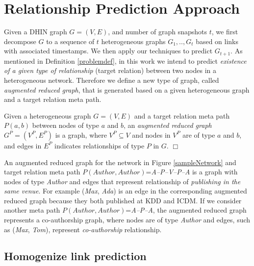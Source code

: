 \section{Relationship Prediction Approach}

Given a DHIN graph $G=(V,E)$, and number of graph snapshots $t$, we first decompose $G$ to a sequence of $t$ heterogeneous graphs ${G_1, .., G_t}$ based on links with associated timestamps. We then apply our techniques to predict $G_{t+1}$. As mentioned in Definition \ref{problemdef}, in this work we intend to predict \textit{existence of a given type of relationship} (target relation) between two nodes in a heterogeneous network. Therefore we define a new type of graph, called \textit{augmented reduced graph}, that is generated based on a given heterogeneous graph and a target relation meta path. 

\begin{definition}\label{def:ARG}
Given a heterogeneous graph $G=(V,E)$ and a target relation meta path $P(a,b)$ between nodes of type $a$ and $b$, an \textit{augmented reduced graph} $G^P=(V^P,E^P)$ is a graph, where $V^P \subseteq V$ and nodes in $V^P$ are of type $a$ and $b$, and edges in $E^P$ indicates relationships of type $P$ in $G$. $\Box$
\end{definition}

An augmented reduced graph for the network in Figure \ref{sampleNetwork} and target relation meta path $P(Author,Author)$=\textit{A--P--V--P--A} is a graph with nodes of type \textit{Author} and edges that represent relationship of \textit{publishing in the same venue}. For example (\textit{Max}, \textit{Ada}) is an edge in the corresponding augmented reduced graph because they both published at KDD and ICDM. If we consider another meta path $P(Author,Author)$=\textit{A--P--A}, the augmented reduced graph represents a co-authorship graph, where nodes are of type \textit{Author} and edges, such as (\textit{Max}, \textit{Tom}), represent \textit{co-authorship} relationship.  



\subsection{Homogenize link prediction}


